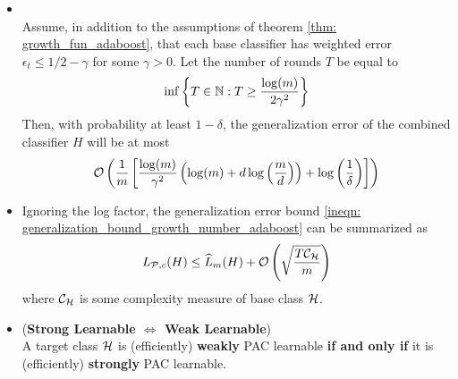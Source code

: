 \documentclass[11pt]{article}
\begin{document}
\begin{itemize}
\item \begin{corollary}  \citep{schapire2012boosting}\\
Assume, in addition to the assumptions of theorem \ref{thm: growth_fun_adaboost}, that each base classifier has weighted error $\epsilon_t \le 1/2 - \gamma$ for some $\gamma > 0$. Let the number of rounds $T$ be equal to
\begin{align*}
\inf\left\{T \in {\mathbb N}: T \ge \frac{\log(m)}{2\gamma^2}\right\}
\end{align*} Then, with probability at least $1 - \delta$, the generalization error of the combined classifier $H$ will be at most
\begin{align*}
{\mathcal O}\left(\frac{1}{m}\left[\frac{\log(m)}{\gamma^2}\left(\log(m) + d\log\left(\frac{m}{d}\right)\right) + \log\left(\frac{1}{\delta}\right)\right]\right)
\end{align*}
\end{corollary}

\item \begin{remark}
Ignoring the log factor, the generalization error bound \eqref{ineqn: generalization_bound_growth_number_adaboost} can be summarized as
\begin{align*}
L_{{\mathcal P}, c}(H) \le \widehat{L}_{m}(H) + {\mathcal O}\left(\sqrt{\frac{T {\mathcal C}_{{\mathcal H}}}{m}}\right)
\end{align*} where ${\mathcal C}_{{\mathcal H}}$ is some complexity measure of base class ${\mathcal H}$.
\end{remark}

\item \begin{theorem} (\textbf{Strong Learnable $\Leftrightarrow$ Weak Learnable})  \citep{schapire2012boosting}\\
A target class ${\mathcal H}$ is (efficiently) \textbf{weakly} PAC learnable \textbf{if and only if} it is (efficiently) \textbf{strongly} PAC learnable.
\end{theorem}
\end{itemize}
\end{document}

